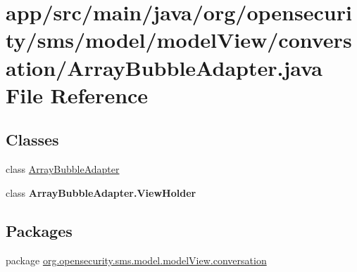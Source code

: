 \hypertarget{a00018}{\section{app/src/main/java/org/opensecurity/sms/model/model\+View/conversation/\+Array\+Bubble\+Adapter.java File Reference}
\label{a00018}
}
\subsection*{Classes}
\begin{DoxyCompactItemize}
\item 
class \hyperlink{a00002}{Array\+Bubble\+Adapter}
\item 
class {\bfseries Array\+Bubble\+Adapter.\+View\+Holder}
\end{DoxyCompactItemize}
\subsection*{Packages}
\begin{DoxyCompactItemize}
\item 
package \hyperlink{a00037}{org.\+opensecurity.\+sms.\+model.\+model\+View.\+conversation}
\end{DoxyCompactItemize}
